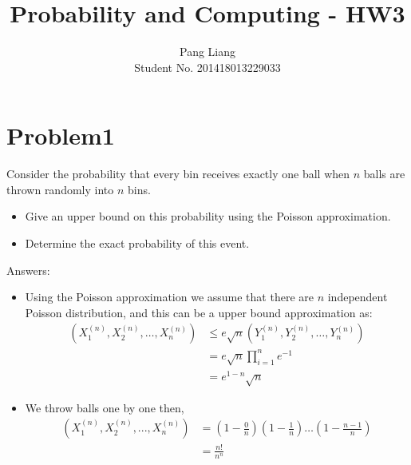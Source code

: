 \documentclass[12pt]{article}
\title{Probability and Computing - HW3}
\author{Pang Liang\\ Student No. 201418013229033}
\begin{document}
\maketitle

\section{Problem1}
Consider the probability that every bin receives exactly one ball when $n$ balls are thrown randomly into $n$ bins.
\begin{itemize}
\item Give an upper bound on this probability using the Poisson approximation.
\item Determine the exact probability of this event.
\end{itemize}

Answers:
\begin{itemize}
\item Using the Poisson approximation
we assume that there are $n$ independent Poisson distribution, and this can be a upper bound approximation as:
\begin{equation}
    \begin{split}
    (X_1^{(n)}, X_2^{(n)}, \dots, X_n^{(n)}) &\le e\sqrt{n} (Y_1^{(n)}, Y_2^{(n)}, \dots, Y_n^{(n)})\\
    &= e\sqrt{n} \prod_{i=1}^n e^{-1}\\
    &= e^{1-n}\sqrt{n}
    \end{split}
\end{equation}

\item We throw balls one by one then,
\begin{equation}
    \begin{split}
    (X_1^{(n)}, X_2^{(n)}, ..., X_n^{(n)}) &= (1-\frac{0}{n})(1-\frac{1}{n})\dots(1-\frac{n-1}{n})\\
    &= \frac{n!}{n^n}
    \end{split}
\end{equation}
\end{itemize}
\end{document}
